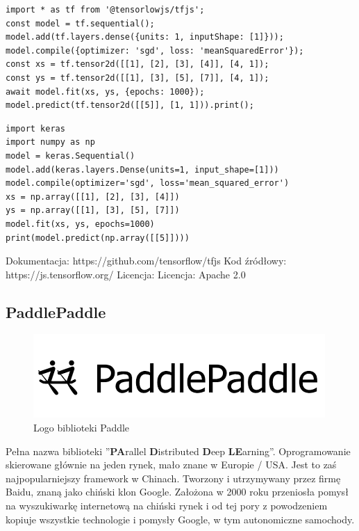 \documentclass[12pt,a4paper,twoside,titlepage,openright]{book}
\begin{document}
\noindent
\begin{minipage}{\linewidth}
\begin{lstlisting}[caption=Proste operacje w JavaScript z Tensorflow.js, label=lst:test]
import * as tf from '@tensorlowjs/tfjs';
const model = tf.sequential();
model.add(tf.layers.dense({units: 1, inputShape: [1]}));
model.compile({optimizer: 'sgd', loss: 'meanSquaredError'});
const xs = tf.tensor2d([[1], [2], [3], [4]], [4, 1]);
const ys = tf.tensor2d([[1], [3], [5], [7]], [4, 1]);
await model.fit(xs, ys, {epochs: 1000});
model.predict(tf.tensor2d([[5]], [1, 1])).print();
\end{lstlisting}
\end{minipage}

\noindent
\begin{minipage}{\linewidth}
\begin{lstlisting}[caption=Prosty model w języku Python używając Keras, label=lst:test]
import keras
import numpy as np
model = keras.Sequential()
model.add(keras.layers.Dense(units=1, input_shape=[1]))
model.compile(optimizer='sgd', loss='mean_squared_error')
xs = np.array([[1], [2], [3], [4]])
ys = np.array([[1], [3], [5], [7]])
model.fit(xs, ys, epochs=1000)
print(model.predict(np.array([[5]])))
\end{lstlisting}
\end{minipage}

\noindent
\newline
Dokumentacja: https://github.com/tensorflow/tfjs
\newline
Kod źródłowy: https://js.tensorflow.org/
\newline
Licencja: Licencja: Apache 2.0

\subsection{PaddlePaddle}
\begin{figure}[ht]
	\centering
			\includegraphics[resolution=100, scale=1.2]{PaddlePaddle.png}
		\caption{Logo biblioteki Paddle}
\end{figure}
Pełna nazwa biblioteki ''\textbf{PA}rallel \textbf{D}istributed \textbf{D}eep \textbf{LE}arning''. Oprogramowanie skierowane głównie na jeden rynek, mało znane w Europie / USA. Jest to zaś najpopularniejszy framework w Chinach. Tworzony i utrzymywany przez firmę Baidu, znaną jako chiński klon Google. Założona w 2000 roku przeniosła pomysł na wyszukiwarkę internetową na chiński rynek i od tej pory z powodzeniem kopiuje wszystkie technologie i pomysły Google, w tym autonomiczne samochody. 
\end{document}
